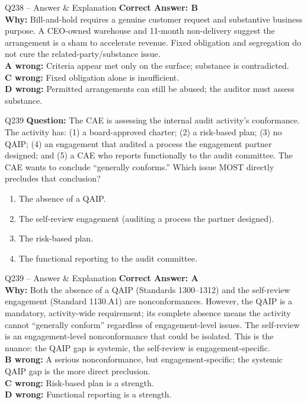 \documentclass[aspectratio=169,10pt]{beamer}
\begin{document}
	\begin{frame}[t]{Q238 -- Answer \& Explanation}
		\small
		\textbf{Correct Answer: B} \\[4pt]
		\textbf{Why:} Bill-and-hold requires a genuine customer request and substantive business purpose. A CEO-owned warehouse and 11-month non-delivery suggest the arrangement is a sham to accelerate revenue. Fixed obligation and segregation do not cure the related-party/substance issue. \\[4pt]
		\textbf{A wrong:} Criteria appear met only on the surface; substance is contradicted. \\[2pt]
		\textbf{C wrong:} Fixed obligation alone is insufficient. \\[2pt]
		\textbf{D wrong:} Permitted arrangements can still be abused; the auditor must assess substance.
	\end{frame}
	
	\begin{frame}[t]{Q239}
		\small
		\textbf{Question:} The CAE is assessing the internal audit activity's conformance. The activity has: (1) a board-approved charter; (2) a risk-based plan; (3) no QAIP; (4) an engagement that audited a process the engagement partner designed; and (5) a CAE who reports functionally to the audit committee. The CAE wants to conclude ``generally conforms.'' Which issue MOST directly precludes that conclusion?
		\begin{enumerate}[label=\Alph*.,itemsep=1pt,topsep=2pt]
			\item The absence of a QAIP.
			\item The self-review engagement (auditing a process the partner designed).
			\item The risk-based plan.
			\item The functional reporting to the audit committee.
		\end{enumerate}
	\end{frame}
	
	\begin{frame}[t]{Q239 -- Answer \& Explanation}
		\small
		\textbf{Correct Answer: A} \\[4pt]
		\textbf{Why:} Both the absence of a QAIP (Standards 1300--1312) and the self-review engagement (Standard 1130.A1) are nonconformances. However, the QAIP is a mandatory, activity-wide requirement; its complete absence means the activity cannot ``generally conform'' regardless of engagement-level issues. The self-review is an engagement-level nonconformance that could be isolated. This is the nuance: the QAIP gap is systemic, the self-review is engagement-specific. \\[4pt]
		\textbf{B wrong:} A serious nonconformance, but engagement-specific; the systemic QAIP gap is the more direct preclusion. \\[2pt]
		\textbf{C wrong:} Risk-based plan is a strength. \\[2pt]
		\textbf{D wrong:} Functional reporting is a strength.
	\end{frame}
	
\end{document}
